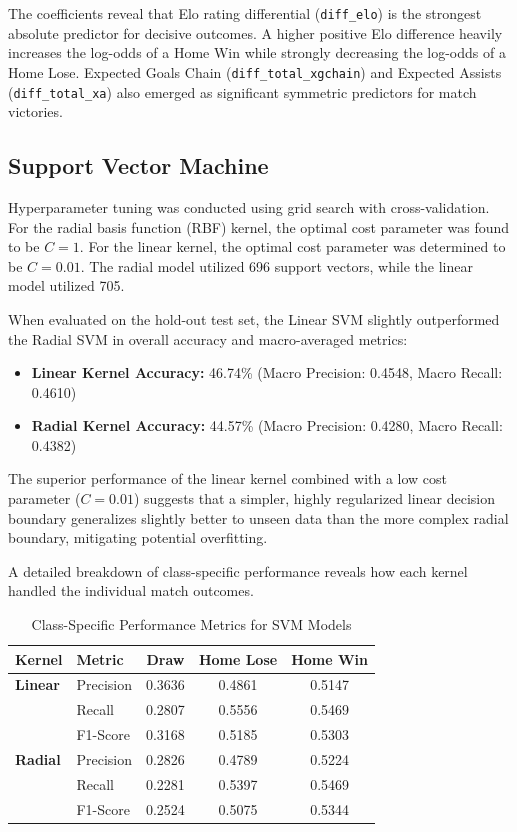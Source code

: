 \documentclass[11pt]{article}
\begin{document}
The coefficients reveal that Elo rating differential (\texttt{diff\_elo}) is the strongest absolute predictor for decisive outcomes. A higher positive Elo difference heavily increases the log-odds of a Home Win while strongly decreasing the log-odds of a Home Lose. Expected Goals Chain (\texttt{diff\_total\_xgchain}) and Expected Assists (\texttt{diff\_total\_xa}) also emerged as significant symmetric predictors for match victories.

\subsection{Support Vector Machine}

Hyperparameter tuning was conducted using grid search with cross-validation. For the radial basis function (RBF) kernel, the optimal cost parameter was found to be $C = 1$. For the linear kernel, the optimal cost parameter was determined to be $C = 0.01$. The radial model utilized 696 support vectors, while the linear model utilized 705.

When evaluated on the hold-out test set, the Linear SVM slightly outperformed the Radial SVM in overall accuracy and macro-averaged metrics:

\begin{itemize}
    \item \textbf{Linear Kernel Accuracy:} 46.74\% (Macro Precision: 0.4548, Macro Recall: 0.4610)
    \item \textbf{Radial Kernel Accuracy:} 44.57\% (Macro Precision: 0.4280, Macro Recall: 0.4382)
\end{itemize}

The superior performance of the linear kernel combined with a low cost parameter ($C = 0.01$) suggests that a simpler, highly regularized linear decision boundary generalizes slightly better to unseen data than the more complex radial boundary, mitigating potential overfitting.

A detailed breakdown of class-specific performance reveals how each kernel handled the individual match outcomes. 

\begin{table}[h!]
\centering
\begin{tabular}{llccc}
\hline
\textbf{Kernel} & \textbf{Metric} & \textbf{Draw} & \textbf{Home Lose} & \textbf{Home Win} \\
\hline
\textbf{Linear} & Precision & 0.3636 & 0.4861 & 0.5147 \\
                & Recall    & 0.2807 & 0.5556 & 0.5469 \\
                & F1-Score  & 0.3168 & 0.5185 & 0.5303 \\
\hline
\textbf{Radial} & Precision & 0.2826 & 0.4789 & 0.5224 \\
                & Recall    & 0.2281 & 0.5397 & 0.5469 \\
                & F1-Score  & 0.2524 & 0.5075 & 0.5344 \\
\hline
\end{tabular}
\caption{Class-Specific Performance Metrics for SVM Models}
\label{tab:svm_metrics}
\end{table}
\end{document}
